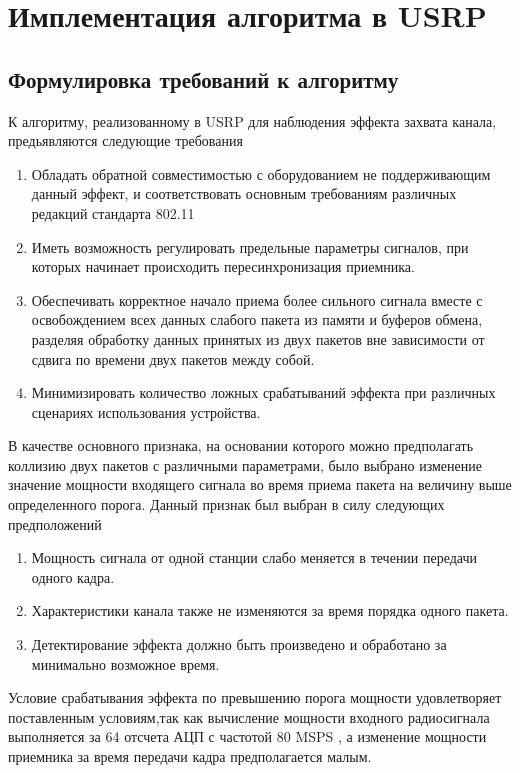 \documentclass{llncs}
\begin{document}
\section{Имплементация алгоритма в USRP}
\subsection{Формулировка требований к алгоритму}
К алгоритму, реализованному в USRP для наблюдения эффекта захвата канала,  предьявляются следующие требования
\begin{enumerate}
\item Обладать  обратной совместимостью с оборудованием не поддерживающим данный эффект, и соответствовать основным требованиям различных редакций стандарта 802.11
\item Иметь возможность регулировать предельные параметры  сигналов, при которых  начинает происходить пересинхронизация приемника. 
\item Обеспечивать корректное начало приема более сильного сигнала вместе с освобождением всех данных слабого пакета из памяти и буферов обмена, разделяя обработку данных принятых из двух пакетов вне зависимости от сдвига по времени двух пакетов между собой.
\item Минимизировать количество ложных срабатываний эффекта при различных сценариях 
использования устройства.
 
\end{enumerate}  В качестве
основного признака, на основании которого можно предполагать коллизию двух пакетов с различными параметрами, было выбрано изменение значение мощности входящего сигнала во время приема пакета на величину выше определенного порога. Данный признак был выбран в силу следующих предположений \begin{enumerate}
\item Мощность сигнала от одной станции слабо меняется в течении передачи одного кадра. 
\item Характеристики канала также не изменяются за время порядка одного пакета. 
\item Детектирование эффекта должно быть произведено и обработано за минимально возможное время.

\end{enumerate} 
Условие срабатывания эффекта по превышению порога мощности удовлетворяет поставленным условиям,так как вычисление мощности входного радиосигнала выполняется за 64 отсчета АЦП с частотой 80 MSPS , а изменение мощности приемника за  время передачи кадра предполагается малым.
\\\
\end{document}
